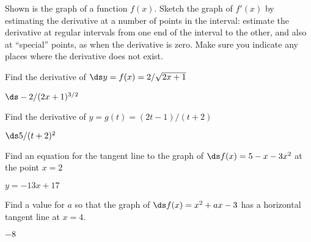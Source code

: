 \begin{exercises}
\begin{exercise}
Shown is the graph of a function $f(x)$. Sketch the graph of $f'(x)$
by estimating the derivative at a number of points in the interval:
estimate the derivative at regular intervals from one end of the
interval to the other, and also at ``special'' points, as when the
derivative is zero. Make sure you indicate any places where the
derivative does not exist.
\end{exercise}

\begin{exercise}
Find the derivative of $\ds y=f(x)=2/\sqrt{2x+1}$ 
\begin{answer} $\ds -2/(2x+1)^{3/2}$
\end{answer}\end{exercise}

\begin{exercise}
Find the derivative of $y=g(t)=(2t-1)/(t+2)$
\begin{answer} $\ds 5/(t+2)^2$
\end{answer}\end{exercise}

\begin{exercise}
Find an equation for the tangent line to the graph of $\ds f(x)=5-x-3x^2$ at the point $x=2$
\begin{answer} $y=-13x+17$
\end{answer}\end{exercise}

\begin{exercise}
Find a value for $a$ so that the graph of $\ds f(x)=x^2+ax-3$ has a horizontal tangent line at $x=4$.
\begin{answer} $-8$
\end{answer}\end{exercise}

\end{exercises}
